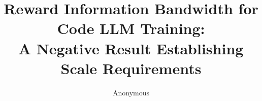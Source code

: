 \documentclass[10pt]{article}
\title{Reward Information Bandwidth for Code LLM Training:\\ A Negative Result Establishing Scale Requirements}
\author{Anonymous}
\date{}
\begin{document}
\maketitle

\begin{abstract}

\end{abstract}

















\end{document}
